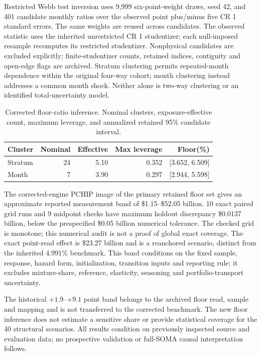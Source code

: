Restricted Webb test inversion uses 9,999 six-point-weight draws, seed 42, and 401 candidate monthly ratios over the observed point plus/minus five CR 1 standard errors. The same weights are reused across candidates. The observed statistic uses the inherited unrestricted CR 1 studentizer; each null-imposed resample recomputes its restricted studentizer. Nonphysical candidates are excluded explicitly; finite-studentizer counts, retained indices, contiguity and open-edge flags are archived. Stratum clustering permits repeated-month dependence within the original four-way cohort; month clustering instead addresses a common month shock. Neither alone is two-way clustering or an identified total-uncertainty model.

\begin{table}[H]\centering\small
\caption{Corrected floor-ratio inference. Nominal clusters, exposure-effective count, maximum leverage, and annualized retained 95\% candidate interval.}\label{tab:correctedfloor}
\begin{tabular}{@{}lrrrr@{}}\toprule
Cluster & Nominal & Effective & Max leverage & Floor(\%)\\\midrule
Stratum & 24 & 5.10 & 0.352 & [3.652, 6.509] \\
Month & 7 & 3.90 & 0.297 & [2.944, 5.598] \\
\bottomrule\end{tabular}\end{table}

The corrected-engine PCHIP image of the primary retained floor set gives an approximate reported measurement band of \$1.15--\$52.05 billion. 10 exact paired grid runs and 9 midpoint checks have maximum holdout discrepancy \$0.0137 billion, below the prespecified \$0.05 billion numerical tolerance. The checked grid is monotone; this numerical audit is not a proof of global exact coverage. The exact point-read effect is \$23.27 billion and is a reanchored scenario, distinct from the inherited 4.991\% benchmark. This band conditions on the fixed sample, response, hazard form, initialization, transition inputs and reporting rule; it excludes mixture-share, reference, elasticity, seasoning and portfolio-transport uncertainty.

The historical $+1.9$--$+9.1$ point band belongs to the archived floor read, sample and mapping and is not transferred to the corrected benchmark. The new floor inference does not estimate a sensitive share or provide statistical coverage for the 40 structural scenarios. All results condition on previously inspected source and evaluation data; no prospective validation or full-SOMA causal interpretation follows.
